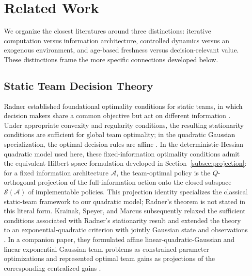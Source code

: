 \documentclass[11pt]{article}
\begin{document}
\section{Related Work}
\label{sec:related_work}

We organize the closest literatures around three distinctions: iterative
computation versus information architecture, controlled dynamics versus an
exogenous environment, and age-based freshness versus decision-relevant value.
These distinctions frame the more specific connections developed below.

\subsection{Static Team Decision Theory}

Radner established foundational optimality conditions for static teams, in which decision makers share a common objective but act on different information \cite{radner1962team}. Under appropriate convexity and regularity conditions, the resulting stationarity conditions are sufficient for global team optimality; in the quadratic Gaussian specialization, the optimal decision rules are affine \cite{radner1962team,marschak1972economic}. In the deterministic-Hessian quadratic model used here, these fixed-information optimality conditions admit the equivalent Hilbert-space formulation developed in Section~\ref{subsec:projection}: for a fixed information architecture $\mathcal A$, the team-optimal policy is the $Q$-orthogonal projection of the full-information action onto the closed subspace $\mathcal S(\mathcal A)$ of implementable policies. This projection identity specializes the classical static-team framework to our quadratic model; Radner's theorem is not stated in this literal form. Krainak, Speyer, and Marcus subsequently relaxed the sufficient conditions associated with Radner's stationarity result and extended the theory to an exponential-quadratic criterion with jointly Gaussian state and observations \cite{krainak1982staticI}. In a companion paper, they formulated affine linear-quadratic-Gaussian and linear-exponential-Gaussian team problems as constrained parameter optimizations and represented optimal team gains as projections of the corresponding centralized gains \cite{krainak1982staticII}.
\end{document}
